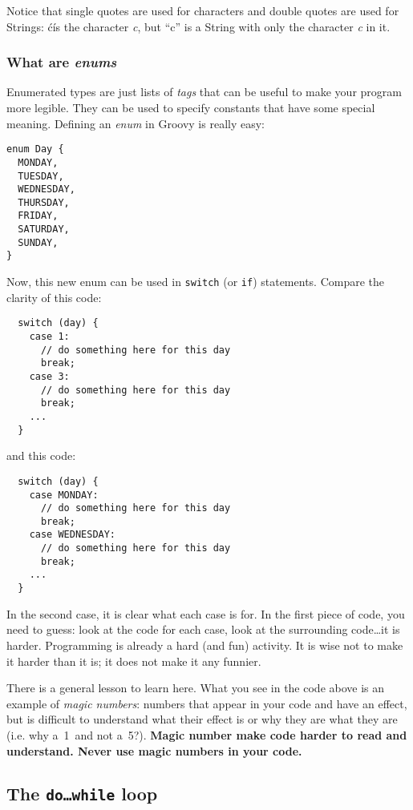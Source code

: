 Notice that single quotes are used for characters and double quotes
are used for Strings: \'c\' is the character \emph{c}, but ``c'' is a
String with only the character \emph{c} in it. 

\subsubsection{What are \emph{enums}}
\label{sec:what-types-enum}

Enumerated types are just lists of \emph{tags} that can be useful to
make your program more legible. They can be used to specify constants
that have some special meaning. Defining an \emph{enum} in Groovy is
really easy: 

\begin{verbatim}
enum Day {
  MONDAY,
  TUESDAY,
  WEDNESDAY,
  THURSDAY,
  FRIDAY,
  SATURDAY,
  SUNDAY,
}
\end{verbatim}

Now, this new enum can be used in \texttt{switch} (or \texttt{if})
statements. Compare the clarity of this code:

\begin{verbatim}
  switch (day) {
    case 1: 
      // do something here for this day
      break;
    case 3: 
      // do something here for this day
      break;
    ...
  }
\end{verbatim}

and this code:

\begin{verbatim}
  switch (day) {
    case MONDAY: 
      // do something here for this day
      break;
    case WEDNESDAY: 
      // do something here for this day
      break;
    ...
  }
\end{verbatim}

In the second case, it is clear what each case is for. In the first
piece of code, you need to guess: look at the code for each case, look
at the surrounding code\ldots it is harder. Programming is already a
hard (and fun) activity. It is wise not to make it harder than it is;
it does not make it any funnier. 

There is a general lesson to learn here. What you see in the code
above is an example of \emph{magic numbers}: numbers that appear in
your code and have an effect, but is difficult to understand what
their effect is or why they are what they are (i.e. why a~1~and not
a~5?). \textbf{Magic number make code harder to read and
  understand. Never use magic numbers in your code.}

\subsection{The \texttt{do\ldots while} loop}
\label{sec:textttd-while-loop}






